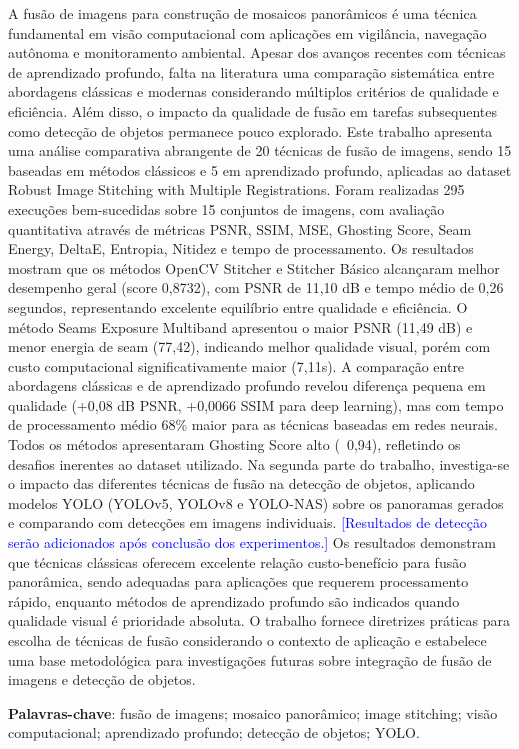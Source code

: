 
\begin{resumoutfpr}%

A fusão de imagens para construção de mosaicos panorâmicos é uma técnica fundamental em visão computacional com aplicações em vigilância, navegação autônoma e monitoramento ambiental. Apesar dos avanços recentes com técnicas de aprendizado profundo, falta na literatura uma comparação sistemática entre abordagens clássicas e modernas considerando múltiplos critérios de qualidade e eficiência. Além disso, o impacto da qualidade de fusão em tarefas subsequentes como detecção de objetos permanece pouco explorado. Este trabalho apresenta uma análise comparativa abrangente de 20 técnicas de fusão de imagens, sendo 15 baseadas em métodos clássicos e 5 em aprendizado profundo, aplicadas ao dataset Robust Image Stitching with Multiple Registrations. Foram realizadas 295 execuções bem-sucedidas sobre 15 conjuntos de imagens, com avaliação quantitativa através de métricas PSNR, SSIM, MSE, Ghosting Score, Seam Energy, DeltaE, Entropia, Nitidez e tempo de processamento. Os resultados mostram que os métodos OpenCV Stitcher e Stitcher Básico alcançaram melhor desempenho geral (score 0,8732), com PSNR de 11,10 dB e tempo médio de 0,26 segundos, representando excelente equilíbrio entre qualidade e eficiência. O método Seams Exposure Multiband apresentou o maior PSNR (11,49 dB) e menor energia de seam (77,42), indicando melhor qualidade visual, porém com custo computacional significativamente maior (7,11s). A comparação entre abordagens clássicas e de aprendizado profundo revelou diferença pequena em qualidade (+0,08 dB PSNR, +0,0066 SSIM para deep learning), mas com tempo de processamento médio 68\% maior para as técnicas baseadas em redes neurais. Todos os métodos apresentaram Ghosting Score alto (~0,94), refletindo os desafios inerentes ao dataset utilizado. Na segunda parte do trabalho, investiga-se o impacto das diferentes técnicas de fusão na detecção de objetos, aplicando modelos YOLO (YOLOv5, YOLOv8 e YOLO-NAS) sobre os panoramas gerados e comparando com detecções em imagens individuais. \textcolor{blue}{[Resultados de detecção serão adicionados após conclusão dos experimentos.]} Os resultados demonstram que técnicas clássicas oferecem excelente relação custo-benefício para fusão panorâmica, sendo adequadas para aplicações que requerem processamento rápido, enquanto métodos de aprendizado profundo são indicados quando qualidade visual é prioridade absoluta. O trabalho fornece diretrizes práticas para escolha de técnicas de fusão considerando o contexto de aplicação e estabelece uma base metodológica para investigações futuras sobre integração de fusão de imagens e detecção de objetos.

\vspace{1em}

\noindent\textbf{Palavras-chave}: fusão de imagens; mosaico panorâmico; image stitching; visão computacional; aprendizado profundo; detecção de objetos; YOLO.

\end{resumoutfpr}
